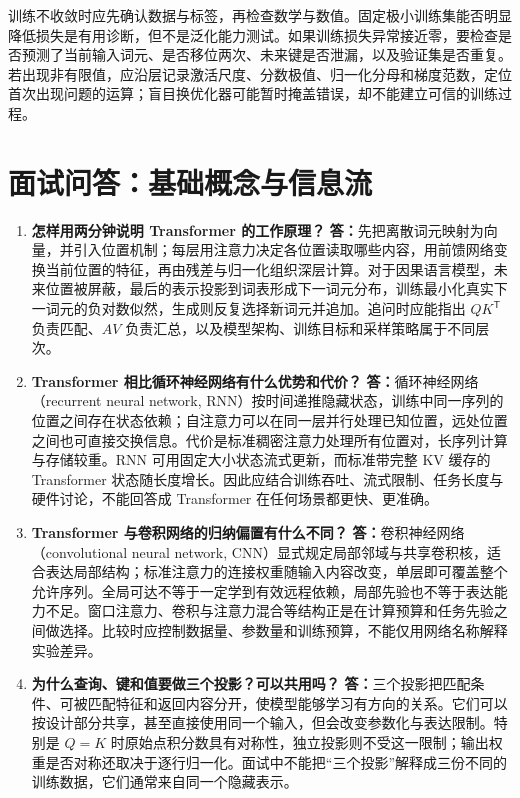\documentclass[UTF8,12pt,a4paper,fontset=fandol]{ctexart}
\begin{document}
训练不收敛时应先确认数据与标签，再检查数学与数值。固定极小训练集能否明显降低损失是有用诊断，但不是泛化能力测试。如果训练损失异常接近零，要检查是否预测了当前输入词元、是否移位两次、未来键是否泄漏，以及验证集是否重复。若出现非有限值，应沿层记录激活尺度、分数极值、归一化分母和梯度范数，定位首次出现问题的运算；盲目换优化器可能暂时掩盖错误，却不能建立可信的训练过程。

\section{面试问答：基础概念与信息流}
\label{sec:tr-qa-basic}

\begin{enumerate}[label=\arabic*.,series=trquestions]
\item \textbf{怎样用两分钟说明 Transformer 的工作原理？}
\textbf{答：}先把离散词元映射为向量，并引入位置机制；每层用注意力决定各位置读取哪些内容，用前馈网络变换当前位置的特征，再由残差与归一化组织深层计算。对于因果语言模型，未来位置被屏蔽，最后的表示投影到词表形成下一词元分布，训练最小化真实下一词元的负对数似然，生成则反复选择新词元并追加。追问时应能指出 $QK^{\mathsf T}$ 负责匹配、$AV$ 负责汇总，以及模型架构、训练目标和采样策略属于不同层次。

\item \textbf{Transformer 相比循环神经网络有什么优势和代价？}
\textbf{答：}循环神经网络（recurrent neural network, RNN）按时间递推隐藏状态，训练中同一序列的位置之间存在状态依赖；自注意力可以在同一层并行处理已知位置，远处位置之间也可直接交换信息。代价是标准稠密注意力处理所有位置对，长序列计算与存储较重。RNN 可用固定大小状态流式更新，而标准带完整 KV 缓存的 Transformer 状态随长度增长。因此应结合训练吞吐、流式限制、任务长度与硬件讨论，不能回答成 Transformer 在任何场景都更快、更准确。

\item \textbf{Transformer 与卷积网络的归纳偏置有什么不同？}
\textbf{答：}卷积神经网络（convolutional neural network, CNN）显式规定局部邻域与共享卷积核，适合表达局部结构；标准注意力的连接权重随输入内容改变，单层即可覆盖整个允许序列。全局可达不等于一定学到有效远程依赖，局部先验也不等于表达能力不足。窗口注意力、卷积与注意力混合等结构正是在计算预算和任务先验之间做选择。比较时应控制数据量、参数量和训练预算，不能仅用网络名称解释实验差异。

\item \textbf{为什么查询、键和值要做三个投影？可以共用吗？}
\textbf{答：}三个投影把匹配条件、可被匹配特征和返回内容分开，使模型能够学习有方向的关系。它们可以按设计部分共享，甚至直接使用同一个输入，但会改变参数化与表达限制。特别是 $Q=K$ 时原始点积分数具有对称性，独立投影则不受这一限制；输出权重是否对称还取决于逐行归一化。面试中不能把“三个投影”解释成三份不同的训练数据，它们通常来自同一个隐藏表示。


\end{enumerate}
\end{document}
